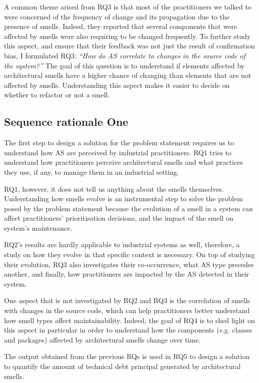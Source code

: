 A common theme arised from RQ3 is that most of the practitioners we talked to were concerned of the frequency of change and its propagation due to the presence of smells. Indeed, they reported that several components that were affected by smells were also requiring to be changed frequently.
To further study this aspect, and ensure that their feedback was not just the result of confirmation bias, I formulated RQ3: \textit{``How do AS correlate to changes in the source code of the system?''}
The goal of this question is to understand if elements affected by architectural smells have a higher chance of changing than elements that are not affected by smells.
Understanding this aspect makes it easier to decide on whether to refactor or not a smell.




\subsection{Sequence rationale One}
The first step to design a solution for the problem statement requires us to understand how AS are perceived by industrial practitioners.
RQ1 tries to understand how practitioners perceive architectural smells and what practices they use, if any, to manage them in an industrial setting.

RQ1, however, it does not tell us anything about the smells themselves. Understanding how smells evolve is an instrumental step to solve the problem posed by the problem statement because the evolution of a smell in a system can affect practitioners' prioritisation decisions, and the impact of the smell on system's maintenance.

RQ2's results are hardly applicable to industrial systems as well, therefore, a study on how they evolve in that specific context is necessary.
On top of studying their evolution, RQ3 also investigates their co-occurrence, what AS type precedes another, and finally, how practitioners are impacted by the AS detected in their system.

One aspect that is not investigated by RQ2 and RQ3 is the correlation of smells with changes in the source code, which can help practitioners better understand how smell types affect maintainability. Indeed, the goal of RQ4 is to shed light on this aspect in particular in order to understand how the components (e.g. classes and packages) affected by architectural smells change over time.

The output obtained from the previous RQs is used in RQ5 to design a solution to quantify the amount of technical debt principal generated by architectural smells.

